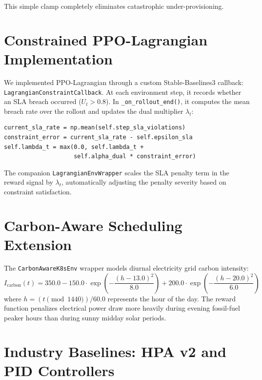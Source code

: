 \documentclass[12pt]{report}
\begin{document}
This simple clamp completely eliminates catastrophic under-provisioning.

\section{Constrained PPO-Lagrangian Implementation}

We implemented PPO-Lagrangian through a custom Stable-Baselines3 callback: \texttt{Lagrangian\-Constraint\-Callback}. At each environment step, it records whether an SLA breach occurred ($U_t > 0.8$). In \texttt{\_on\_rollout\_end()}, it computes the mean breach rate over the rollout and updates the dual multiplier $\lambda_t$:

\begin{minipage}{\linewidth}
\begin{framed}
\footnotesize
\begin{verbatim}
current_sla_rate = np.mean(self.step_sla_violations)
constraint_error = current_sla_rate - self.epsilon_sla
self.lambda_t = max(0.0, self.lambda_t + 
                    self.alpha_dual * constraint_error)
\end{verbatim}
\end{framed}
\end{minipage}

The companion \texttt{LagrangianEnvWrapper} scales the SLA penalty term in the reward signal by $\lambda_t$, automatically adjusting the penalty severity based on constraint satisfaction.

\section{Carbon-Aware Scheduling Extension}

The \texttt{CarbonAwareK8sEnv} wrapper models diurnal electricity grid carbon intensity:
\begin{equation}
I_{\text{carbon}}(t) = 350.0 - 150.0 \cdot \exp\left( -\frac{(h - 13.0)^2}{8.0} \right) + 200.0 \cdot \exp\left( -\frac{(h - 20.0)^2}{6.0} \right)
\end{equation}
where $h = (t \pmod{1440}) / 60.0$ represents the hour of the day. The reward function penalizes electrical power draw more heavily during evening fossil-fuel peaker hours than during sunny midday solar periods.

\section{Industry Baselines: HPA v2 and PID Controllers}
\end{document}
